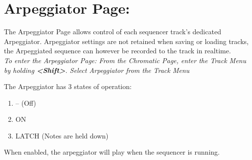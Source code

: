 \chapter{Arpeggiator Page:}
The Arpeggiator Page allows control of each sequencer track's dedicated Arpeggiator. Arpeggiator settings are not retained when saving or loading tracks, the Arpeggiated sequence can however be recorded to the track in realtime.
\\
\textit{To enter the Arpeggiator Page: From the Chromatic Page, enter the Track Menu by holding \textbf{<Shift>}. Select Arpeggiator from the Track Menu }

The Arpeggiator has 3 states of operation:
\begin{enumerate}
    \item -- (Off)
    \item ON
    \item LATCH (Notes are held down)
\end{enumerate}

When enabled, the arpeggiator will  play when the sequencer is running. 

